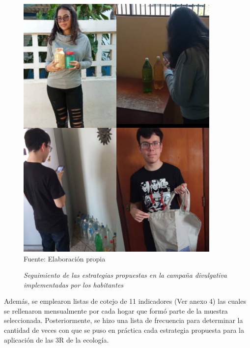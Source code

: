 \begin{figure}[h]
    \centering
    \captionsetup{singlelinecheck=false, justification=raggedright, labelsep=newline}
    \caption{\textit{Seguimiento de las estrategias propuestas en la campaña divulgativa implementadas por los habitantes}}
    \includegraphics[width=10cm]{Media/Fotos/Foto 7 seguimiento.jpeg}
    \\\RaggedRight Fuente: Elaboración propia
    \label{fig:seguimiento}
\end{figure}

\newpage

Además, se emplearon listas de cotejo de 11 indicadores (Ver anexo 4) las cuales se rellenaron mensualmente por cada hogar que formó parte de la muestra seleccionada. Posteriormente, se hizo una lista de frecuencia para determinar la cantidad de veces con que se puso en práctica cada estrategia propuesta para la aplicación de las 3R de la ecología. 

